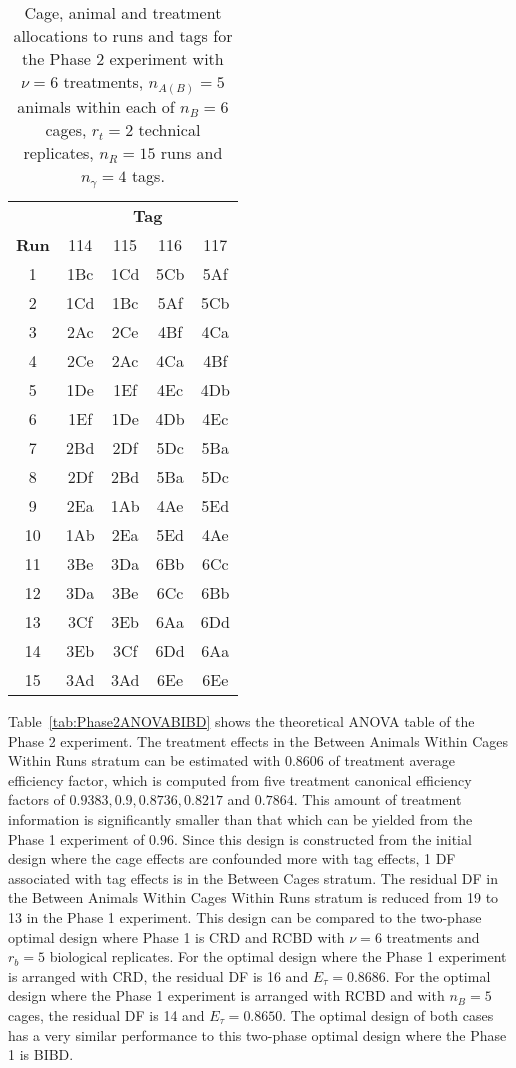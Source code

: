 \begin{table}[ht]
\centering
\itshape
\caption{Cage, animal and treatment allocations to runs and tags for the Phase 2 experiment with $\nu = 6$ treatments, $n_{A(B)} = 5$ animals within each of $n_B = 6$ cages, $r_t = 2$ technical replicates, $n_R = 15$ runs and $n_\gamma = 4$ tags.}
\begin{tabular}[t]{c|cccc}
 & \multicolumn{4}{c}{{\bf Tag}} \\
{\bf Run}  & \textnormal{114} & \textnormal{115} & \textnormal{116} & \textnormal{117} \\ 
\hline 
\textnormal{1} & 1Bc & 1Cd & 5Cb & 5Af \\
\textnormal{2} & 1Cd & 1Bc & 5Af & 5Cb \\
\textnormal{3} & 2Ac & 2Ce & 4Bf & 4Ca \\
\textnormal{4} & 2Ce & 2Ac & 4Ca & 4Bf \\
\textnormal{5} & 1De & 1Ef & 4Ec & 4Db \\
\textnormal{6} & 1Ef & 1De & 4Db & 4Ec \\
\textnormal{7} & 2Bd & 2Df & 5Dc & 5Ba \\
\textnormal{8} & 2Df & 2Bd & 5Ba & 5Dc \\
\textnormal{9} & 2Ea & 1Ab & 4Ae & 5Ed \\
\textnormal{10}& 1Ab & 2Ea & 5Ed & 4Ae \\
\textnormal{11}& 3Be & 3Da & 6Bb & 6Cc \\
\textnormal{12}& 3Da & 3Be & 6Cc & 6Bb \\
\textnormal{13}& 3Cf & 3Eb & 6Aa & 6Dd \\
\textnormal{14}& 3Eb & 3Cf & 6Dd & 6Aa \\
\textnormal{15}& 3Ad & 3Ad & 6Ee & 6Ee \\
\end{tabular} 
\label{tab:cagAniDesEx3}
\end{table}

Table~\ref{tab:Phase2ANOVABIBD} shows the theoretical ANOVA table of the Phase 2 experiment. The treatment effects in the Between Animals Within Cages Within Runs stratum can be estimated with $0.8606$ of treatment average efficiency factor, which is computed from five treatment canonical efficiency factors of $0.9383, 0.9, 0.8736, 0.8217$ and $0.7864$. This amount of treatment information is significantly smaller than that which can be yielded from the Phase 1 experiment of $0.96$. Since this design is constructed from the initial design where the cage effects are confounded more with tag effects, 1 DF associated with tag effects is in the Between Cages stratum. The residual DF in the Between Animals Within Cages Within Runs stratum is reduced from 19 to 13 in the Phase 1 experiment. This design can be compared to the two-phase optimal design where Phase 1 is CRD and RCBD with $\nu = 6$ treatments and $r_b = 5$ biological replicates. For the optimal design where the Phase 1 experiment is arranged with CRD, the residual DF is 16 and $E_\tau = 0.8686$. For the optimal design where the Phase 1 experiment is arranged with RCBD and with $n_B = 5$ cages, the residual DF is 14 and $E_\tau = 0.8650$. The optimal design of both cases has a very similar performance to this two-phase optimal design where the Phase 1 is BIBD. 

